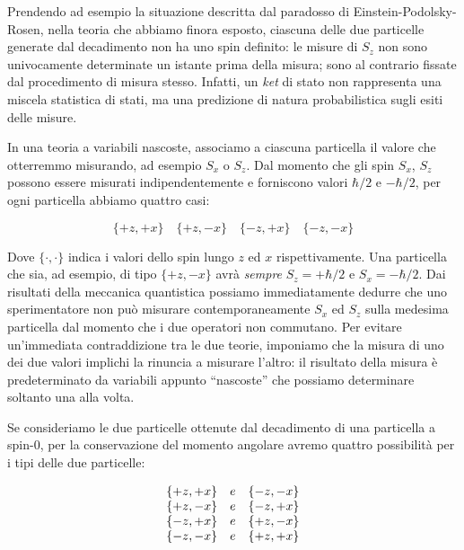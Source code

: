 Prendendo ad esempio la situazione descritta dal paradosso di Einstein-Podolsky-Rosen, nella teoria che abbiamo finora esposto, ciascuna delle due particelle generate dal decadimento non ha uno spin definito: le misure di $S_z$ non sono univocamente determinate un istante prima della misura; sono al contrario fissate dal procedimento di misura stesso. Infatti, un \textit{ket} di stato non rappresenta una miscela statistica di stati, ma una predizione di natura probabilistica sugli esiti delle misure.

In una teoria a variabili nascoste, associamo a ciascuna particella il valore che otterremmo misurando, ad esempio $S_x$ o $S_z$. Dal momento che gli spin $S_x$, $S_z$ possono essere misurati indipendentemente e forniscono valori $\hbar / 2$ e $-\hbar / 2$, per ogni particella abbiamo quattro casi:

	\begin{equation}
		\{ +z, +x \} \quad \{ +z, -x \} \quad \{ -z, +x \} \quad \{ -z, -x \}
	\end{equation}

Dove $\{ \cdot, \cdot \} $ indica i valori dello spin lungo $z$ ed $x$ rispettivamente. Una particella che sia, ad esempio, di tipo $\{ +z, -x \}$ avr\`a \textit{sempre} $S_z = + \hbar / 2$ e $S_x = - \hbar / 2$. Dai risultati della meccanica quantistica possiamo immediatamente dedurre che uno sperimentatore non pu\`o misurare contemporaneamente $S_x$ ed $S_z$ sulla medesima particella dal momento che i due operatori non commutano. Per evitare un'immediata contraddizione tra le due teorie, imponiamo che la misura di uno dei due valori implichi la rinuncia a misurare l'altro: il risultato della misura \`e predeterminato da variabili appunto ``nascoste'' che possiamo determinare soltanto una alla volta.

Se consideriamo le due particelle ottenute dal decadimento di una particella a spin-0, per la conservazione del momento angolare avremo quattro possibilit\`a per i tipi delle due particelle:

	\begin{equation}
		\begin{array}{c c c}
			\{ +z, +x \} & e & \{ -z, -x \} \\
			\{ +z, -x \} & e & \{ -z, +x \} \\
			\{ -z, +x \} & e & \{ +z, -x \} \\
			\{ -z, -x \} & e & \{ +z, +x \} \\
		\end{array}
	\end{equation}

